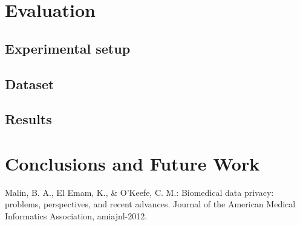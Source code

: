 \documentclass[10pt,letterpaper,oneside,draft]{article}
\begin{document}

\section{Evaluation}
\subsection{Experimental setup}
\subsection{Dataset}
\subsection{Results}




\section{Conclusions and Future Work}

\begin{thebibliography}{10}

Malin, B. A., El Emam, K., \& O'Keefe, C. M.: {Biomedical data privacy: problems, perspectives, and recent advances.} Journal of the American Medical Informatics Association, amiajnl-2012.

\end{thebibliography}
\end{document}
